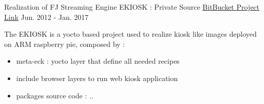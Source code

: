 \documentclass[11pt, a4paper]{awesome-cv} %
\begin{document}
\begin{cventries}

    \cventry
    {Realization of FJ Streaming Engine} %
    {EKIOSK : Private Source} %
    { \href{https://bitbucket.org/easysoftin/workspace/projects/ECK}{BitBucket Project Link} }%
    {Jun. 2012 - Jan. 2017}  %
    { %
        \begin{cvitems}
            \item {The EKIOSK is a yocto based project used to realize kiosk like images deployed on ARM raspberry pie, composed by :}
            \begin{itemize}
                \item { meta-eck : yocto layer that define all needed recipes }
                \item { include browser layers to run web kiosk application }            
                \item { packages source code : ..}            
            \end{itemize}
        \end{cvitems}
    }



\end{cventries}
\end{document}
